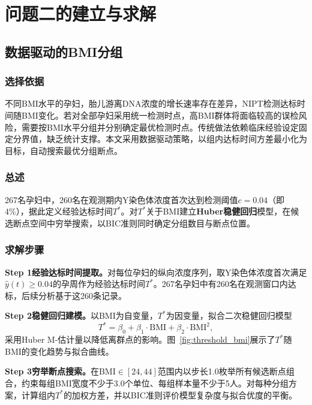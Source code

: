 \section{问题二的建立与求解}

\subsection{数据驱动的BMI分组}

\subsubsection{选择依据}

不同BMI水平的孕妇，胎儿游离DNA浓度的增长速率存在差异，NIPT检测达标时间随BMI变化。若对全部孕妇采用统一检测时点，高BMI群体将面临较高的误检风险，需要按BMI水平分组并分别确定最优检测时点。传统做法依赖临床经验设定固定分界值，缺乏统计支撑。本文采用数据驱动策略，以组内达标时间方差最小化为目标，自动搜索最优分组断点。

\subsubsection{总述}

267名孕妇中，260名在观测期内Y染色体浓度首次达到检测阈值$c=0.04$（即4\%），据此定义经验达标时间$T^*$。对$T^*$关于BMI建立\textbf{Huber稳健回归}模型，在候选断点空间中穷举搜索，以BIC准则同时确定分组数目与断点位置。

\subsubsection{求解步骤}

\textbf{Step 1\quad 经验达标时间提取。}对每位孕妇的纵向浓度序列，取Y染色体浓度首次满足$\hat{y}(t) \geq 0.04$的孕周作为经验达标时间$T^*$。267名孕妇中有260名在观测窗口内达标，后续分析基于这260条记录。

\textbf{Step 2\quad 稳健回归建模。}以BMI为自变量，$T^*$为因变量，拟合二次稳健回归模型
\begin{equation}\label{eq:robust_reg}
  T^* = \beta_0 + \beta_1 \cdot \mathrm{BMI} + \beta_2 \cdot \mathrm{BMI}^2,
\end{equation}
采用Huber M-估计量以降低离群点的影响。图~\ref{fig:threshold_bmi}展示了$T^*$随BMI的变化趋势与拟合曲线。

\textbf{Step 3\quad 穷举断点搜索。}在BMI$\in[24,44]$范围内以步长1.0枚举所有候选断点组合，约束每组BMI宽度不少于3.0个单位、每组样本量不少于5人。对每种分组方案，计算组内$T^*$的加权方差，并以BIC准则评价模型复杂度与拟合优度的平衡。

